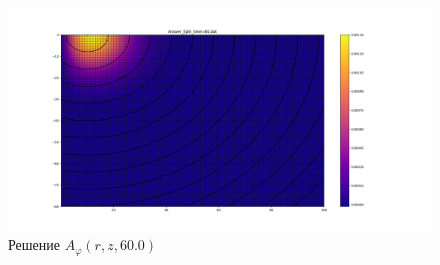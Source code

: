 \begin{figure}
	\centering
	\includegraphics[width=1.0\linewidth]{images/Answer_Ephi_time=60.png}
	\caption{Решение $A_{\varphi}(r, z, 60.0)$}
	\label{fig:E_phi_60}
\end{figure} 
